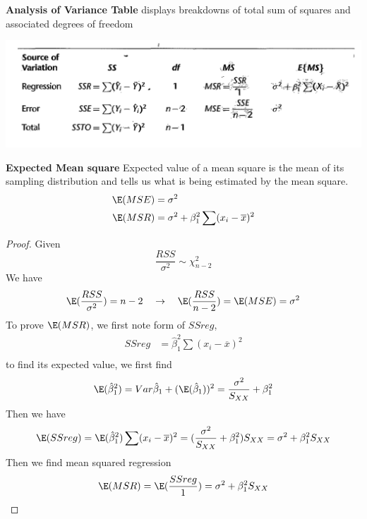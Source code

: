 \documentclass[11pt]{article}
\begin{document}
\begin{defn*}
	\textbf{Analysis of Variance Table} displays breakdowns of total sum of squares and associated degrees of freedom
	\begin{center}
		\includegraphics[width=\textwidth]{anova_table}
	\end{center}
\end{defn*}

\begin{defn*}
	\textbf{Expected Mean square} Expected value of a mean square is the mean of its sampling distribution and tells us what is being estimated by the mean square. 
	\begin{align*}
		\E(MSE) &= \sigma^2 \\
		\E(MSR) &= \sigma^2 + \beta_1^2 \sum (x_i - \overline{x})^2
	\end{align*}
	\begin{proof}
		Given 
		\[
			\frac{RSS}{\sigma^2} \sim \chi^2_{n-2}
		\]
		We have 
		\[
			\E(\frac{RSS}{\sigma^2}) = n-2 \quad \to \quad \E(\frac{RSS}{n-2}) = \E(MSE) = \sigma^2
		\]
		To prove $\E(MSR)$, we first note form of $SSreg$,
		\begin{align*}
			SSreg 
			&= \hat{\beta}_1^2 \sum (x_i - \overline{x})^2 \\
		\end{align*}
		to find its expected value, we first find 
		\[
			\E(\hat{\beta}_1^2) 
			= Var{\hat{\beta}_1} + (\E(\hat{\beta}_1))^2
			= \frac{\sigma^2}{S_{XX}} + \beta_1^2 
		\]
		Then we have 
		\[
			\E(SSreg) 
			= \E(\hat{\beta}_1^2) \sum (x_i - \overline{x})^2
			= (\frac{\sigma^2}{S_{XX}} + \beta_1^2 ) S_{XX}
			= \sigma^2 + \beta_1^2 S_{XX}
		\]
		Then we find mean squared regression 
		\[
			\E(MSR) = \E(\frac{SSreg}{1}) = \sigma^2 + \beta_1^2 S_{XX}
		\]
	\end{proof}
\end{defn*}
\end{document}
